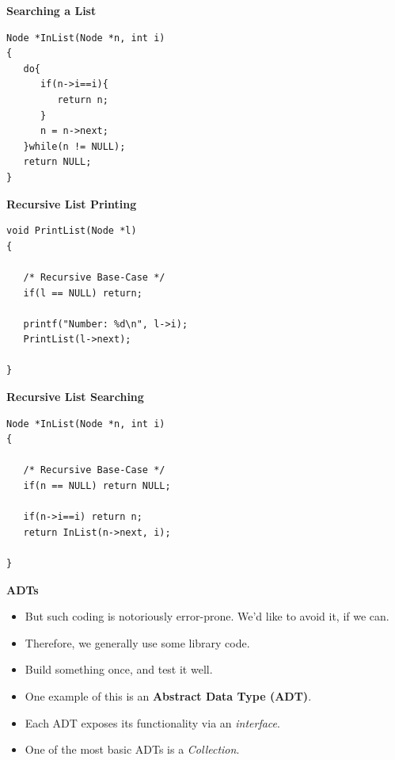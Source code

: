 \documentclass[a4,portraitt]{slides}
\begin{document}
\newpage
{\samepage
\begin{center}
{\Large{\bf Searching a List}}
\end{center}
\begin{verbatim}
Node *InList(Node *n, int i)
{
   do{
      if(n->i==i){
         return n;
      }
      n = n->next;
   }while(n != NULL);
   return NULL;
}
\end{verbatim}
}

\newpage
{\samepage
\begin{center}
{\Large{\bf Recursive List Printing}}
\end{center}
\begin{verbatim}
void PrintList(Node *l)
{

   /* Recursive Base-Case */
   if(l == NULL) return;

   printf("Number: %d\n", l->i);
   PrintList(l->next);

}
\end{verbatim}
\begin{center}
{\Large{\bf Recursive List Searching}}
\end{center}
\begin{verbatim}
Node *InList(Node *n, int i)
{

   /* Recursive Base-Case */
   if(n == NULL) return NULL;

   if(n->i==i) return n;
   return InList(n->next, i);

}
\end{verbatim}
}

\newpage
{\samepage
\begin{center}
{\Large{\bf ADTs}}
\end{center}
\begin{itemize}
\item But such coding is notoriously error-prone. We'd
like to avoid it, if we can.
\item Therefore, we generally use some library code.
\item Build something once, and test it well.
\item One example of this is an {\bf Abstract Data Type (ADT)}.
\item Each ADT exposes its functionality via an {\em interface}. 
\item One of the most basic ADTs is a {\em Collection}.
\end{itemize}
}
\end{document}
